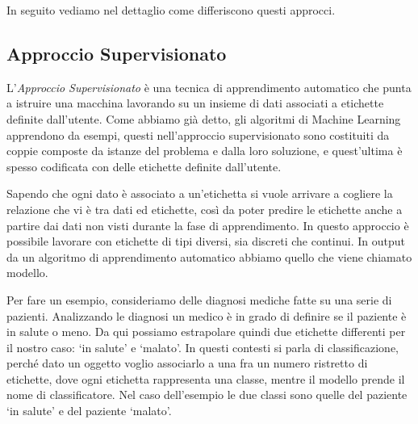 \documentclass[a4paper,12pt]{report}
\begin{document}
\noindent In seguito vediamo nel dettaglio come differiscono questi approcci.

\subsection*{Approccio Supervisionato}
L'\textit{Approccio Supervisionato} \cite{machine_learning_oreilly}\cite{unsupervised_learning} è una tecnica di apprendimento automatico che punta a istruire una macchina lavorando su un insieme di dati associati a etichette definite dall'utente.
Come abbiamo già detto, gli algoritmi di Machine Learning apprendono da esempi, questi nell'approccio supervisionato sono costituiti da coppie composte da istanze del problema e dalla loro soluzione, e quest'ultima è spesso codificata con delle etichette definite dall'utente. 

Sapendo che ogni dato è associato a un'etichetta si vuole arrivare a cogliere la relazione che vi è tra dati ed etichette, così da poter predire le etichette anche a partire dai dati non visti durante la fase di apprendimento. 
In questo approccio è possibile lavorare con etichette di tipi diversi, sia discreti che continui.
In output da un algoritmo di apprendimento automatico abbiamo quello che viene chiamato modello. 



Per fare un esempio, consideriamo delle diagnosi mediche fatte su una serie  di pazienti. 
Analizzando le diagnosi un medico è in grado di definire se il paziente è in salute o meno. Da qui possiamo estrapolare quindi due etichette differenti per il nostro caso: `in salute' e `malato'. 
In questi contesti si parla di classificazione, perché dato un oggetto voglio associarlo a una fra un numero ristretto di etichette, dove ogni etichetta rappresenta una classe, mentre il modello prende il nome di classificatore. Nel caso dell'esempio le due classi sono quelle del paziente `in salute' e del paziente `malato'. 
\end{document}
